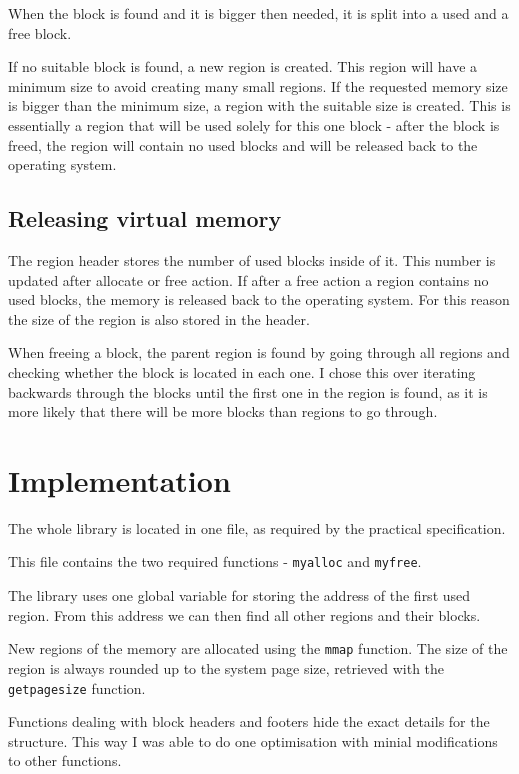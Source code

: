 \documentclass{article}
\begin{document}
When the block is found and it is bigger then needed, it is split into a used and a free block.

If no suitable block is found, a new region is created. This region will have a minimum size to avoid creating many small regions. If the requested memory size is bigger than the minimum size, a region with the suitable size is created. This is essentially a region that will be used solely for this one block - after the block is freed, the region will contain no used blocks and will be released back to the operating system.

\subsection{Releasing virtual memory}

The region header stores the number of used blocks inside of it. This number is updated after allocate or free action. If after a free action a region contains no used blocks, the memory is released back to the operating system. For this reason the size of the region is also stored in the header.

When freeing a block, the parent region is found by going through all regions and checking whether the block is located in each one. I chose this over iterating backwards through the blocks until the first one in the region is found, as it is more likely that there will be more blocks than regions to go through.

\section{Implementation}

The whole library is located in one file, as required by the practical specification.

This file contains the two required functions - \lstinline{myalloc} and \lstinline{myfree}.

The library uses one global variable for storing the address of the first used region. From this address we can then find all other regions and their blocks.

New regions of the memory are allocated using the \lstinline{mmap} function. The size of the region is always rounded up to the system page size, retrieved with the \lstinline{getpagesize} function.

Functions dealing with block headers and footers hide the exact details for the structure. This way I was able to do one optimisation with minial modifications to other functions.
\end{document}

